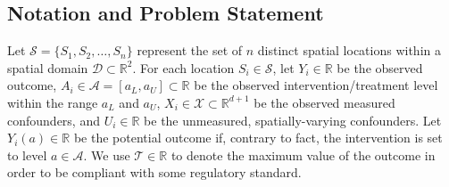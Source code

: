 \documentclass[12pt]{article}
\newcommand{\R}{\mathbb{R}}
\newcommand{\CP}[1]{{\color{purple}From Chan: #1}}
\newcommand{\XL}[1]{{\color{blue}from Xindi: #1}}
\begin{document}
\subsection{Notation and Problem Statement} \label{sec:notation}
 Let $\mathcal{S} = \{S_1,S_2,\ldots,S_n\}$ represent the set of $n$ distinct spatial locations within a spatial domain $\mathcal{D} \subset \mathbb{R}^2$. For each location $S_i\in\mathcal{S}$, let $Y_i\in\mathbb{R}$ 
 be the observed outcome, $A_i\in \mathcal{A}=[a_L,a_U]\subset\R$ be the observed intervention/treatment level within the range $a_L$ and $a_U$,  $X_i\in\mathcal{X}\subset\R^{d+1}$ be the observed measured confounders,  
and $U_i\in\R$ be the unmeasured,  spatially-varying confounders. Let $Y_i(a)\in\mathbb{R}$ 
 be the potential outcome if, contrary to fact, the intervention is set to level $a \in \mathcal{A}$. We use $\mathcal{T} \in \mathbb{R}$ to denote the maximum value of the outcome in order to be compliant with some regulatory standard. 
 
 
\end{document}
